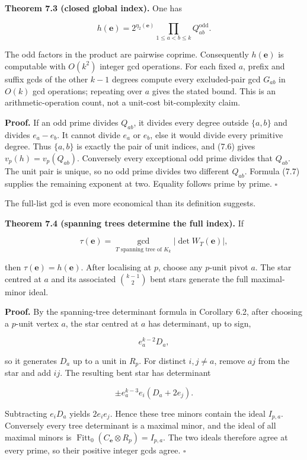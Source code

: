 \documentclass[
  11pt,
  a4paper,
]{article}
\begin{document}
\textbf{Theorem 7.3 (closed global index).} One has

\[
 \boxed{
 h(\mathbf e)=2^{\eta_2(\mathbf e)}
 \prod_{1\le a<b\le k}Q_{ab}^{\mathrm{odd}}.
 }
\tag{7.8}
\]

The odd factors in the product are pairwise coprime. Consequently
\(h(\mathbf e)\) is computable with \(O(k^2)\) integer gcd operations.
For each fixed \(a\), prefix and suffix gcds of the other \(k-1\)
degrees compute every excluded-pair gcd \(G_{ab}\) in \(O(k)\) gcd
operations; repeating over \(a\) gives the stated bound. This is an
arithmetic-operation count, not a unit-cost bit-complexity claim.

\textbf{Proof.} If an odd prime divides \(Q_{ab}\), it divides every
degree outside \(\{a,b\}\) and divides \(e_a-e_b\). It cannot divide
\(e_a\) or \(e_b\), else it would divide every primitive degree. Thus
\(\{a,b\}\) is exactly the pair of unit indices, and (7.6) gives
\(v_p(h)=v_p(Q_{ab})\). Conversely every exceptional odd prime divides
that \(Q_{ab}\). The unit pair is unique, so no odd prime divides two
different \(Q_{ab}\). Formula (7.7) supplies the remaining exponent at
two. Equality follows prime by prime. \(\square\)

The full-list gcd is even more economical than its definition suggests.

\textbf{Theorem 7.4 (spanning trees determine the full index).} If

\[
 \tau(\mathbf e)=
 \gcd_{T\text{ spanning tree of }K_k}|\det W_T(\mathbf e)|,
\]

then \(\tau(\mathbf e)=h(\mathbf e)\). After localising at \(p\), choose
any \(p\)-unit pivot \(a\). The star centred at \(a\) and its associated
\(\binom{k-1}{2}\) bent stars generate the full maximal-minor ideal.

\textbf{Proof.} By the spanning-tree determinant formula in Corollary
6.2, after choosing a \(p\)-unit vertex \(a\), the star centred at \(a\)
has determinant, up to sign,

\[
 e_a^{k-2}D_a,
\]

so it generates \(D_a\) up to a unit in \(R_p\). For distinct
\(i,j\ne a\), remove \(aj\) from the star and add \(ij\). The resulting
bent star has determinant

\[
 \pm e_a^{k-3}e_i(D_a+2e_j).
\]

Subtracting \(e_iD_a\) yields \(2e_ie_j\). Hence these tree minors
contain the ideal \(I_{p,a}\). Conversely every tree determinant is a
maximal minor, and the ideal of all maximal minors is
\(\operatorname{Fitt}_0(C_{\mathbf e}\otimes R_p)=I_{p,a}\). The two
ideals therefore agree at every prime, so their positive integer gcds
agree. \(\square\)
\end{document}
